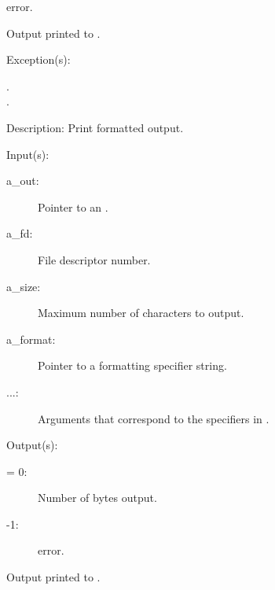 \begin{capi}
\begin{capilist}
\begin{description}
\begin{description}
				 error.
			\end{description}
		\item{Output printed to .}
		\end{description}
	\item[Exception(s): ]
		\begin{description}\item[]
		\item[.]
		\item[.]
		\end{description}
	\item[Description: ]
		Print formatted output.
	\end{capilist}
\label{out_put_fn}
\label{_cw_out_put_fn}
	\begin{capilist}
	\item[Input(s): ]
		\begin{description}\item[]
		\item[a\_out: ]
			Pointer to an .
		\item[a\_fd: ]
			File descriptor number.
		\item[a\_size: ]
			Maximum number of characters to output.
		\item[a\_format: ]
			Pointer to a formatting specifier string.
		\item[...: ]
			Arguments that correspond to the specifiers in
			.
		\end{description}
	\item[Output(s): ]
		\begin{description}\item[]
		\item[retval: ]
			\begin{description}\item[]
			\item[{\gt}= 0: ]
				Number of bytes output.
			\item[-1: ]
				 error.
			\end{description}
		\item{Output printed to .}

\end{description}
\end{capilist}
\end{capi}
